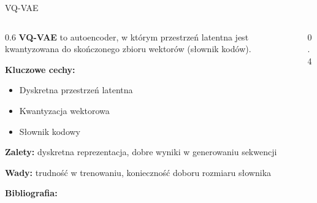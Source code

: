 \documentclass{beamer}
\begin{document}
\begin{frame}{VQ-VAE}
    \begin{columns}
        \begin{column}{0.6\textwidth}
            \textbf{VQ-VAE} to autoencoder, w którym przestrzeń latentna jest kwantyzowana do skończonego zbioru wektorów (słownik kodów).

            \medskip
            \textbf{Kluczowe cechy:}
            \begin{itemize}
                \item Dyskretna przestrzeń latentna
                \item Kwantyzacja wektorowa
                \item Słownik kodowy
            \end{itemize}

            \textbf{Zalety:} dyskretna reprezentacja, dobre wyniki w generowaniu sekwencji

            \textbf{Wady:} trudność w trenowaniu, konieczność doboru rozmiaru słownika

            \textbf{Bibliografia:} \cite{van2017neural}
        \end{column}
        \begin{column}{0.4\textwidth}
            \centering
        \end{column}
    \end{columns}
\end{frame}
\end{document}
